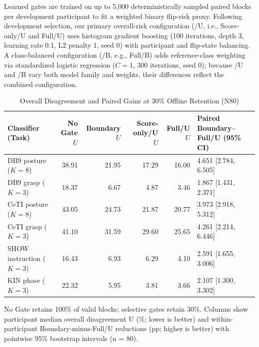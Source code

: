 \documentclass[conference,letterpaper]{IEEEtran}
\begin{document}
Learned gates are trained on up to 5,000 deterministically sampled paired blocks per development participant to fit a weighted binary flip-risk proxy. Following development selection, our primary overall-risk configuration (\textrm{/U}, i.e., \textrm{Score-only/U} and \textrm{Full/U}) uses histogram gradient boosting (100 iterations, depth 3, learning rate 0.1, L2 penalty 1, seed 0) with participant and flip-state balancing. A class-balanced configuration (\textrm{/B}, e.g., \textrm{Full/B}) adds reference-class weighting via standardized logistic regression ($C=1$, 300 iterations, seed 0); because \textrm{/U} and \textrm{/B} vary both model family and weights, their differences reflect the combined configuration.

\begin{table}[!t]
\centering
\caption{Overall Disagreement and Paired Gains at 30\% Offline Retention (N80)}
\label{tab:overall}
\begingroup
\small
\setlength{\tabcolsep}{3pt}
\renewcommand{\arraystretch}{1.05}
\begin{tabular}{lrrrrl}
\toprule
Classifier (Task) & No Gate $U$ & Boundary $U$ & Score-only/U $U$ & Full/U $U$ & Paired Boundary--Full/U (95\% CI)\\
\midrule
DB9 posture ($K=8$) & 38.91 & 21.95 & 17.29 & 16.00 & 4.651 [2.784, 6.505]\\
DB9 grasp ($K=3$) & 18.37 & 6.67 & 4.87 & 3.46 & 1.867 [1.431, 2.371]\\
CeTI posture ($K=8$) & 43.05 & 24.73 & 21.87 & 20.77 & 3.973 [2.918, 5.312]\\
CeTI grasp ($K=3$) & 41.10 & 31.59 & 29.60 & 25.65 & 4.261 [2.214, 6.446]\\
SHOW instruction ($K=3$) & 16.43 & 6.93 & 6.29 & 4.10 & 2.591 [1.655, 3.006]\\
KIN phase ($K=3$) & 22.32 & 5.95 & 3.81 & 3.66 & 2.107 [1.300, 3.302]\\
\bottomrule
\end{tabular}
\par\smallskip
\begin{minipage}{\linewidth}\footnotesize
No Gate retains 100\% of valid blocks; selective gates retain 30\%. Columns show participant median overall disagreement U (\%; lower is better) and within-participant Boundary-minus-Full/U reductions (pp; higher is better) with pointwise 95\% bootstrap intervals (n = 80).
\end{minipage}
\endgroup

\end{table}
\end{document}
